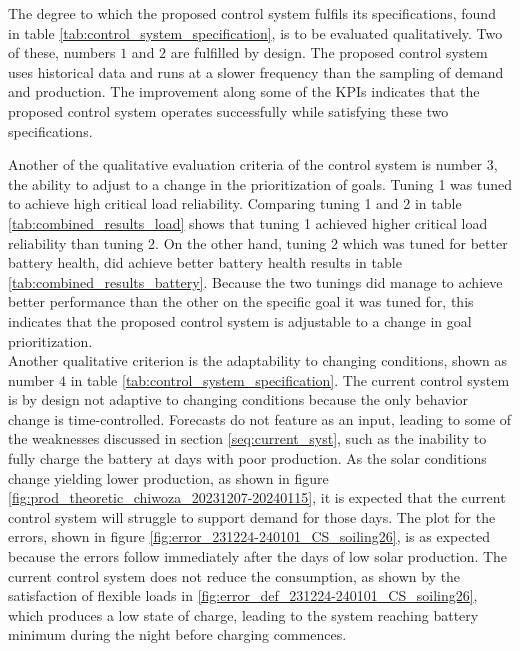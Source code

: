 The degree to which the proposed control system fulfils its specifications, found in table \ref{tab:control_system_specification}, is to be evaluated qualitatively. Two of these, numbers $1$ and $2$ are fulfilled by design. The proposed control system uses historical data and runs at a slower frequency than the sampling of demand and production. The improvement along some of the KPIs indicates that the proposed control system operates successfully while satisfying these two specifications.

Another of the qualitative evaluation criteria of the control system is number $3$, the ability to adjust to a change in the prioritization of goals. Tuning 1 was tuned to achieve high critical load reliability. Comparing tuning 1 and 2 in table \ref{tab:combined_results_load} shows that tuning 1 achieved higher critical load reliability than tuning 2. On the other hand, tuning 2 which was tuned for better battery health, did achieve better battery health results in table \ref{tab:combined_results_battery}. Because the two tunings did manage to achieve better performance than the other on the specific goal it was tuned for, this indicates that the proposed control system is adjustable to a change in goal prioritization. \\

Another qualitative criterion is the adaptability to changing conditions, shown as number $4$ in table \ref{tab:control_system_specification}. The current control system is by design not adaptive to changing conditions because the only behavior change is time-controlled. Forecasts do not feature as an input, leading to some of the weaknesses discussed in section \ref{seq:current_syst}, such as the inability to fully charge the battery at days with poor production. As the solar conditions  change yielding lower production, as shown in figure \ref{fig:prod_theoretic_chiwoza_20231207-20240115}, it is expected that the current control system will struggle to support demand for those days. The plot for the errors, shown in figure \ref{fig:error_231224-240101_CS_soiling26}, is as expected because the errors follow immediately after the days of low solar production. The current control system does not reduce the consumption, as shown by the satisfaction of flexible loads in \ref{fig:error_def_231224-240101_CS_soiling26}, which produces a low state of charge, leading to the system reaching battery minimum during the night before charging commences.

